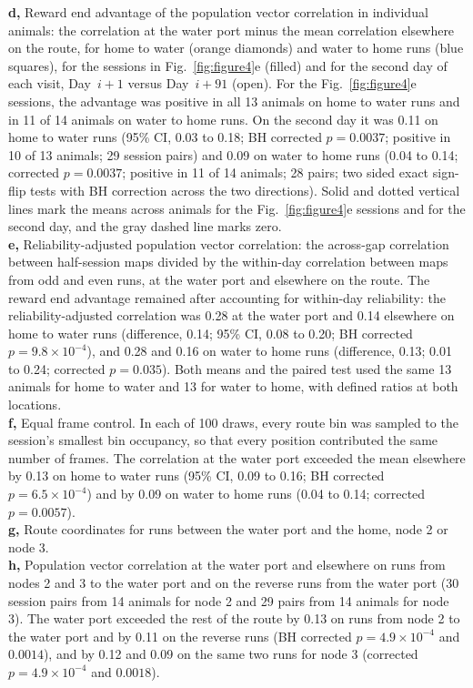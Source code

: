 \documentclass[fleqn,10pt]{wlscirep}
\begin{document}
{\textbf{d,} Reward end advantage of the population vector correlation in individual animals: the correlation at the water port minus the mean correlation elsewhere on the route, for home to water (orange diamonds) and water to home runs (blue squares), for the sessions in Fig.~\ref{fig:figure4}e (filled) and for the second day of each visit, Day~$i+1$ versus Day~$i+91$ (open). For the Fig.~\ref{fig:figure4}e sessions, the advantage was positive in all 13 animals on home to water runs and in 11 of 14 animals on water to home runs. On the second day it was 0.11 on home to water runs (95\% CI, 0.03 to 0.18; BH corrected $p=0.0037$; positive in 10 of 13 animals; 29 session pairs) and 0.09 on water to home runs (0.04 to 0.14; corrected $p=0.0037$; positive in 11 of 14 animals; 28 pairs; two sided exact sign-flip tests with BH correction across the two directions). Solid and dotted vertical lines mark the means across animals for the Fig.~\ref{fig:figure4}e sessions and for the second day, and the gray dashed line marks zero.\\
\textbf{e,} Reliability-adjusted population vector correlation: the across-gap correlation between half-session maps divided by the within-day correlation between maps from odd and even runs, at the water port and elsewhere on the route. The reward end advantage remained after accounting for within-day reliability: the reliability-adjusted correlation was 0.28 at the water port and 0.14 elsewhere on home to water runs (difference, 0.14; 95\% CI, 0.08 to 0.20; BH corrected $p=9.8\times10^{-4}$), and 0.28 and 0.16 on water to home runs (difference, 0.13; 0.01 to 0.24; corrected $p=0.035$). Both means and the paired test used the same 13 animals for home to water and 13 for water to home, with defined ratios at both locations.\\
\textbf{f,} Equal frame control. In each of 100 draws, every route bin was sampled to the session's smallest bin occupancy, so that every position contributed the same number of frames. The correlation at the water port exceeded the mean elsewhere by 0.13 on home to water runs (95\% CI, 0.09 to 0.16; BH corrected $p=6.5\times10^{-4}$) and by 0.09 on water to home runs (0.04 to 0.14; corrected $p=0.0057$).\\
\textbf{g,} Route coordinates for runs between the water port and the home, node 2 or node 3. \\
\textbf{h,} Population vector correlation at the water port and elsewhere on runs from nodes 2 and 3 to the water port and on the reverse runs from the water port (30 session pairs from 14 animals for node 2 and 29 pairs from 14 animals for node 3). The water port exceeded the rest of the route by 0.13 on runs from node 2 to the water port and by 0.11 on the reverse runs (BH corrected $p=4.9\times10^{-4}$ and $0.0014$), and by 0.12 and 0.09 on the same two runs for node 3 (corrected $p=4.9\times10^{-4}$ and $0.0018$).\\
}
\end{document}
